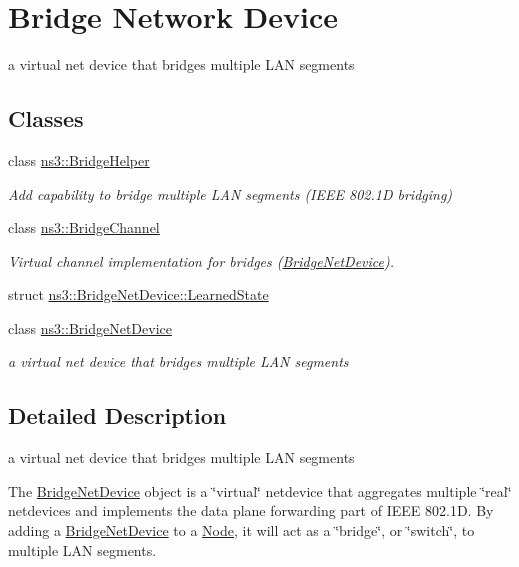 \hypertarget{group__bridge}{}\section{Bridge Network Device}
\label{group__bridge}


a virtual net device that bridges multiple L\+AN segments  


\subsection*{Classes}
\begin{DoxyCompactItemize}
\item 
class \hyperlink{classns3_1_1BridgeHelper}{ns3\+::\+Bridge\+Helper}
\begin{DoxyCompactList}\small\item\em Add capability to bridge multiple L\+AN segments (I\+E\+EE 802.\+1D bridging) \end{DoxyCompactList}\item 
class \hyperlink{classns3_1_1BridgeChannel}{ns3\+::\+Bridge\+Channel}
\begin{DoxyCompactList}\small\item\em Virtual channel implementation for bridges (\hyperlink{classns3_1_1BridgeNetDevice}{Bridge\+Net\+Device}). \end{DoxyCompactList}\item 
struct \hyperlink{structns3_1_1BridgeNetDevice_1_1LearnedState}{ns3\+::\+Bridge\+Net\+Device\+::\+Learned\+State}
\item 
class \hyperlink{classns3_1_1BridgeNetDevice}{ns3\+::\+Bridge\+Net\+Device}
\begin{DoxyCompactList}\small\item\em a virtual net device that bridges multiple L\+AN segments \end{DoxyCompactList}\end{DoxyCompactItemize}


\subsection{Detailed Description}
a virtual net device that bridges multiple L\+AN segments 

The \hyperlink{classns3_1_1BridgeNetDevice}{Bridge\+Net\+Device} object is a \char`\"{}virtual\char`\"{} netdevice that aggregates multiple \char`\"{}real\char`\"{} netdevices and implements the data plane forwarding part of I\+E\+EE 802.\+1D. By adding a \hyperlink{classns3_1_1BridgeNetDevice}{Bridge\+Net\+Device} to a \hyperlink{classns3_1_1Node}{Node}, it will act as a \char`\"{}bridge\char`\"{}, or \char`\"{}switch\char`\"{}, to multiple L\+AN segments.

